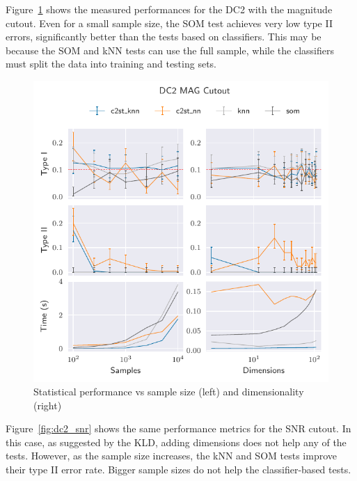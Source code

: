Figure~\ref{fig:dc2_mag} shows the measured performances for the DC2 with the magnitude
cutout. Even for a small sample size, the \gls{SOM}  test achieves very low type II errors, 
significantly better than the tests based on classifiers.
This may be because the \gls{SOM} and \gls{kNN}
tests can use the full sample, while the classifiers must split the data into training and testing sets.


\begin{figure}[htpb]
    \centering
    \includegraphics{images/6_som/dc2_mag}
    \caption[Statistical performance vs sample size and dimensionality.]{
    Statistical performance vs sample size (left) and dimensionality (right)}
    \label{fig:dc2_mag}
\end{figure}

Figure~\ref{fig:dc2_snr} shows the same performance metrics for the \gls{SNR} cutout.
In this case, as suggested by the \gls{KLD}, adding dimensions does not help any of the tests.
However, as the sample size increases, the \gls{kNN} and \gls{SOM}
tests improve their type II error rate. Bigger sample sizes do not help
the classifier-based tests.

